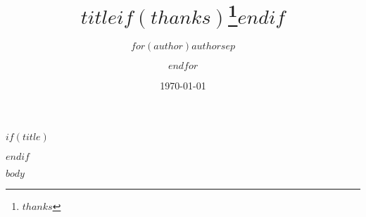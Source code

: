 \documentclass[a4paper, oneside]{ctexbook}
\title{$title$$if(thanks)$\thanks{$thanks$}$endif$}
\author{$for(author)$$author$$sep$ \and $endfor$}
\date{\today}
\begin{document}
$if(title)$
\maketitle
$endif$

\setcounter{tocdepth}{1}
\tableofcontents

$body$
\end{document}
